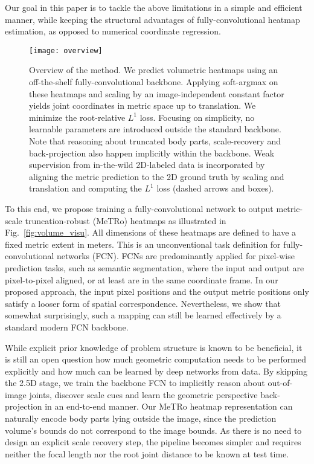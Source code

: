 Our goal in this paper is to tackle the above limitations in a simple and efficient manner, while keeping the structural advantages of fully-convolutional heatmap estimation, as opposed to numerical coordinate regression.
\begin{figure*}[t]
\centering
\texttt{[image: overview]} \\
\caption{Overview of the method.
We predict volumetric heatmaps using an off-the-shelf fully-convolutional backbone.
Applying soft-argmax on these heatmaps and scaling by an image-independent constant factor yields joint coordinates in metric space up to translation.
We minimize the root-relative $L^1$ loss.
Focusing on simplicity, no learnable parameters are introduced outside the standard backbone.
Note that reasoning about truncated body parts, scale-recovery and back-projection also happen implicitly within the backbone.
Weak supervision from in-the-wild 2D-labeled data is incorporated by aligning the metric prediction to the 2D ground truth by scaling and translation and computing the $L^1$ loss (dashed arrows and boxes).}
\label{fig:overview}
\end{figure*}
To this end, we propose training a fully-convolutional network to output metric-scale truncation-robust (MeTRo) heatmaps as illustrated in Fig.~\ref{fig:volume_visu}.
All dimensions of these heatmaps are defined to have a fixed metric extent in meters.
This is an unconventional task definition for fully-convolutional networks (FCN).
FCNs are predominantly applied for pixel-wise prediction tasks, such as semantic segmentation, where the input and output are pixel-to-pixel aligned, or at least are in the same coordinate frame.
In our proposed approach, the input pixel positions and the output metric positions only satisfy a looser form of spatial correspondence.
Nevertheless, we show that somewhat surprisingly, such a mapping can still be learned effectively by a standard modern FCN backbone.

While explicit prior knowledge of problem structure is known to be beneficial, it is still an open question how much geometric computation needs to be performed explicitly and how much can be learned by deep networks from data.
By skipping the 2.5D stage, we train the backbone FCN to implicitly reason about out-of-image joints, discover scale cues and learn the geometric perspective back-projection in an end-to-end manner.
Our MeTRo heatmap representation can naturally encode body parts lying outside the image, since the prediction volume's bounds do not correspond to the image bounds.
As there is no need to design an explicit scale recovery step, the pipeline becomes simpler and requires neither the focal length nor the root joint distance to be known at test time.

